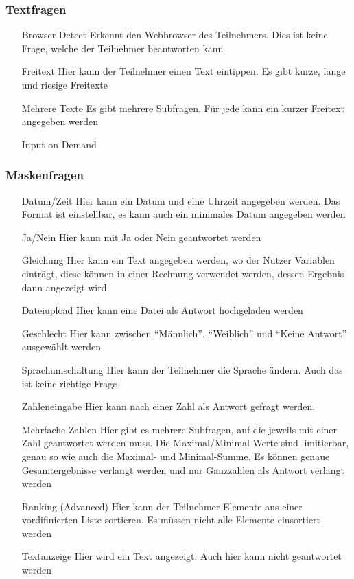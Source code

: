 \subsubsection{Textfragen}

\begin{itemize}
	\item[Browser Detect] Erkennt den Webbrowser des Teilnehmers. Dies ist keine Frage, welche der Teilnehmer beantworten kann
	\item[Freitext] Hier kann der Teilnehmer einen Text eintippen. Es gibt kurze, lange und riesige Freitexte
	\item[Mehrere Texte] Es gibt mehrere Subfragen. Für jede kann ein kurzer Freitext angegeben werden
	\item[Input on Demand] %
\end{itemize}

\subsubsection{Maskenfragen}

\begin{itemize}
	\item[Datum/Zeit] Hier kann ein Datum und eine Uhrzeit angegeben werden. Das Format ist einstellbar, es kann auch ein minimales Datum angegeben werden
	\item[Ja/Nein] Hier kann mit Ja oder Nein geantwortet werden
	\item[Gleichung] Hier kann ein Text angegeben werden, wo der Nutzer Variablen einträgt, diese können in einer Rechnung verwendet werden, dessen Ergebnis dann angezeigt wird
	\item[Dateiupload] Hier kann eine Datei als Antwort hochgeladen werden
	\item[Geschlecht] Hier kann zwischen \enquote{Männlich}, \enquote{Weiblich} und \enquote{Keine Antwort} ausgewählt werden
	\item[Sprachumschaltung] Hier kann der Teilnehmer die Sprache ändern. Auch das ist keine richtige Frage
	\item[Zahleneingabe] Hier kann nach einer Zahl als Antwort gefragt werden.
	\item[Mehrfache Zahlen] Hier gibt es mehrere Subfragen, auf die jeweils mit einer Zahl geantwortet werden muss. Die Maximal/Minimal-Werte sind limitierbar, genau so wie auch die Maximal- und Minimal-Summe. Es können genaue Gesamtergebnisse verlangt werden und nur Ganzzahlen als Antwort verlangt werden
	\item[Ranking (Advanced)] Hier kann der Teilnehmer Elemente aus einer vordifinierten Liste sortieren. Es müssen nicht alle Elemente einsortiert werden
	\item[Textanzeige] Hier wird ein Text angezeigt. Auch hier kann nicht geantwortet werden
\end{itemize}

